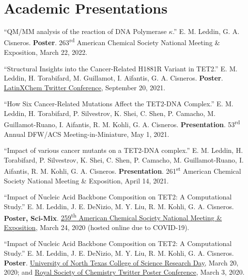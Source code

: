 \documentclass[letterpaper,11pt]{article}
\begin{document}
\section{Academic Presentations}
\begin{etaremune}[start=17]
\small{
  \item \textnormal{``QM/MM analysis of the reaction of DNA Polymerase $\kappa$.'' E. M. Leddin, G. A. Cisneros. \textbf{Poster}. 263\textsuperscript{rd} American Chemical Society National Meeting \& Exposition, March 22, 2022.}
  \item \textnormal{``Structural Insights into the Cancer-Related H1881R Variant in TET2.'' E. M. Leddin, H. Torabifard, M. Guillamot, I. Aifantis, G. A. Cisneros. \textbf{Poster}. \href{https://doi.org/10.26226/morressier.616e5c2362ba8657678b1294}{LatinXChem Twitter Conference}, September 20, 2021.}
  \item \textnormal{``How Six Cancer-Related Mutations Affect the
TET2-DNA Complex.'' E. M. Leddin, H. Torabifard, P. Silvestrov, K. Shei, C. Shen, P. Camacho, M. Guillamot-Ruano, I. Aifantis, R. M. Kohli, G. A. Cisneros. \textbf{Presentation}. 53\textsuperscript{rd} Annual DFW/ACS Meeting-in-Miniature, May 1, 2021.}
  \item \textnormal{``Impact of various cancer mutants on a TET2-DNA complex.'' E. M. Leddin, H. Torabifard, P. Silvestrov, K. Shei, C. Shen, P. Camacho, M. Guillamot-Ruano, I. Aifantis, R. M. Kohli, G. A. Cisneros. \textbf{Presentation}. 261\textsuperscript{st} American Chemical Society National Meeting \& Exposition, April 14, 2021.}
  \item \textnormal{``Impact of Nucleic Acid Backbone Composition on TET2: A Computational Study.'' E. M. Leddin, J. E. DeNizio, M. Y. Liu, R. M. Kohli, G. A. Cisneros. \textbf{Poster, Sci-Mix}. \href{https://www.morressier.com/article/impact-nucleic-acid-backbone-composition-tet2-computational-study/5e735fe0cde2b641284a9da2?}{259\textsuperscript{th} American Chemical Society National Meeting \& Exposition}, March 24, 2020 (hosted online due to COVID-19).}
  \item \textnormal{``Impact of Nucleic Acid Backbone Composition on TET2: A Computational Study.'' E. M. Leddin, J. E. DeNizio, M. Y. Liu, R. M. Kohli, G. A. Cisneros. \textbf{Poster}. \href{https://twitter.com/EmLedd1/status/1239679717575360512?s=20}{University of North Texas College of Science Research Day}, March 20, 2020; and \href{https://twitter.com/EmLedd1/status/1234811448720797696?s=20}{Royal Society of Chemistry Twitter Poster Conference}, March 3, 2020.}
}
\end{etaremune}
\end{document}
